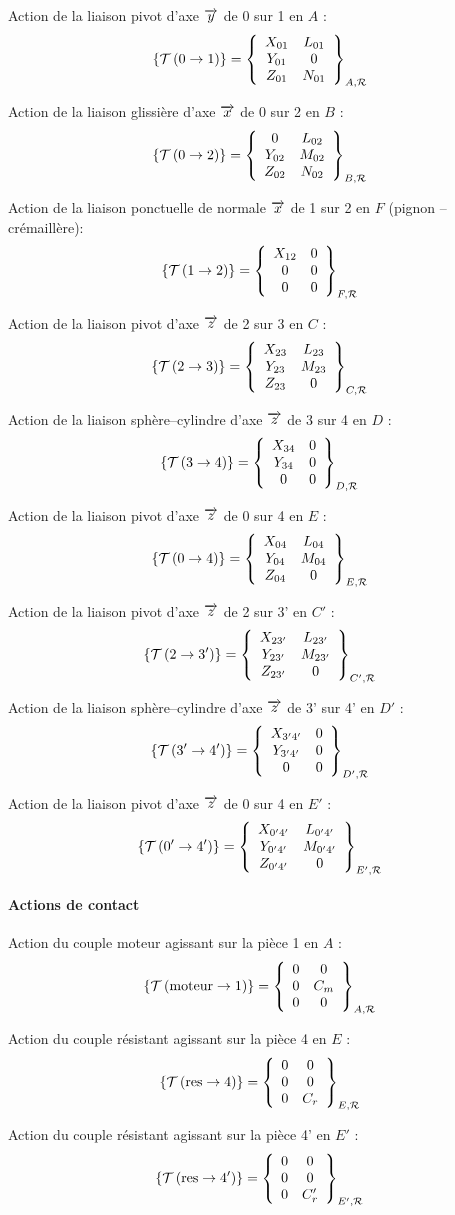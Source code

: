 \documentclass[10pt]{article}
\begin{document}
\begin{multicols}{2}
Action de la liaison pivot d'axe $\vect{y}$ de 0 sur 1 en $A$ :
$$
\torseurstat{T}{0}{1} =
\torseurcol{X_{01}}{Y_{01}}{Z_{01}}{L_{01}}{0}{N_{01}}{A,\mathcal{R}}
$$

Action de la liaison glissière d'axe $\vect{x}$ de 0 sur 2 en $B$ :
$$
\torseurstat{T}{0}{2} =
\torseurcol{0}{Y_{02}}{Z_{02}}{L_{02}}{M_{02}}{N_{02}}{B,\mathcal{R}}
$$

Action de la liaison ponctuelle de normale $\vect{x}$ de 1 sur 2 en $F$ (pignon -- crémaillère):
$$
\torseurstat{T}{1}{2} =
\torseurcol{X_{12}}{0}{0}{0}{0}{0}{F,\mathcal{R}}
$$


Action de la liaison pivot d'axe $\vect{z}$ de 2 sur 3 en $C$ :
$$
\torseurstat{T}{2}{3} =
\torseurcol{X_{23}}{Y_{23}}{Z_{23}}{L_{23}}{M_{23}}{0}{C,\mathcal{R}}
$$

Action de la liaison sphère--cylindre d'axe $\vect{z}$ de 3 sur 4 en $D$ :
$$
\torseurstat{T}{3}{4} =
\torseurcol{X_{34}}{Y_{34}}{0}{0}{0}{0}{D,\mathcal{R}}
$$

Action de la liaison pivot d'axe $\vect{z}$ de 0 sur 4 en $E$ :
$$
\torseurstat{T}{0}{4} =
\torseurcol{X_{04}}{Y_{04}}{Z_{04}}{L_{04}}{M_{04}}{0}{E,\mathcal{R}}
$$



Action de la liaison pivot d'axe $\vect{z}$ de 2 sur 3' en $C'$ :
$$
\torseurstat{T}{2}{3'} =
\torseurcol{X_{23'}}{Y_{23'}}{Z_{23'}}{L_{23'}}{M_{23'}}{0}{C',\mathcal{R}}
$$

Action de la liaison sphère--cylindre d'axe $\vect{z}$ de 3' sur 4' en $D'$ :
$$
\torseurstat{T}{3'}{4'} =
\torseurcol{X_{3'4'}}{Y_{3'4'}}{0}{0}{0}{0}{D',\mathcal{R}}
$$



Action de la liaison pivot d'axe $\vect{z}$ de 0 sur 4 en $E'$ :
$$
\torseurstat{T}{0'}{4'} =
\torseurcol{X_{0'4'}}{Y_{0'4'}}{Z_{0'4'}}{L_{0'4'}}{M_{0'4'}}{0}{E',\mathcal{R}}
$$

\end{multicols}

\paragraph*{Actions de contact}
\begin{multicols}{3}
Action du couple moteur agissant sur la pièce 1 en $A$ :
$$
\torseurstat{T}{\text{moteur}}{1}=
\torseurcol{0}{0}{0}{0}{C_m}{0}{A,\mathcal{R}}
$$


Action du couple résistant agissant sur la pièce 4 en $E$ :
$$
\torseurstat{T}{\text{res}}{4}=
\torseurcol{0}{0}{0}{0}{0}{C_r}{E,\mathcal{R}}
$$

Action du couple résistant agissant sur la pièce 4' en $E'$ :
$$
\torseurstat{T}{\text{res}}{4'}=
\torseurcol{0}{0}{0}{0}{0}{C_r'}{E',\mathcal{R}}
$$
\end{multicols}
\end{document}
